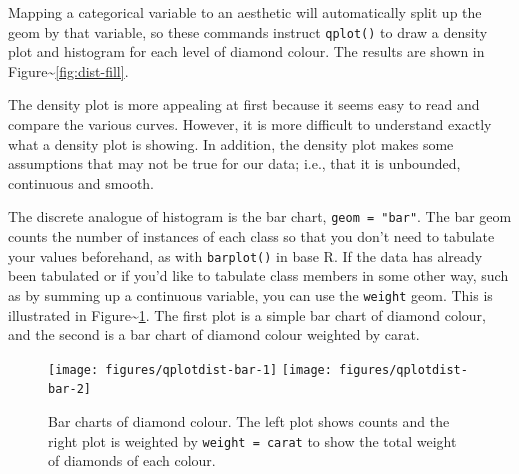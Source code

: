 \noindent Mapping a categorical variable to an aesthetic will
automatically split up the geom by that variable, so these commands
instruct \texttt{qplot()} to draw a density plot and histogram for each
level of diamond colour. The results are shown in
Figure\textasciitilde{}\ref{fig:dist-fill}.

The density plot is more appealing at first because it seems easy to
read and compare the various curves. However, it is more difficult to
understand exactly what a density plot is showing. In addition, the
density plot makes some assumptions that may not be true for our data;
i.e., that it is unbounded, continuous and smooth.


The discrete analogue of histogram is the bar chart,
\texttt{geom = "bar"}. The bar geom counts the number of instances of
each class so that you don't need to tabulate your values beforehand, as
with \texttt{barplot()} in base R. If the data has already been
tabulated or if you'd like to tabulate class members in some other way,
such as by summing up a continuous variable, you can use the
\texttt{weight} geom. This is illustrated in
Figure\textasciitilde{}\ref{fig:dist-bar}. The first plot is a simple
bar chart of diamond colour, and the second is a bar chart of diamond
colour weighted by carat.  

\begin{Shaded}
\begin{Highlighting}[]
  \NormalTok{)}
  \NormalTok{, } 
\StringTok{  }\NormalTok{(}\NormalTok{)}
\end{Highlighting}
\end{Shaded}

\begin{figure}
\texttt{[image: figures/qplotdist-bar-1]} \texttt{[image: figures/qplotdist-bar-2]} \caption{Bar charts of diamond colour.  The left plot shows counts and the right plot is weighted by \texttt{weight = carat} to show the total weight of diamonds of each colour.\label{fig:dist-bar}}
\end{figure}

